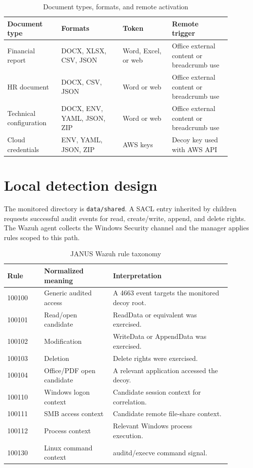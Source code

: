 \begin{table}[H]
\centering
\caption{Document types, formats, and remote activation}
\label{tab:format-policy}
\small
\begin{tabular}{p{0.22\linewidth}p{0.25\linewidth}p{0.20\linewidth}p{0.24\linewidth}}
\toprule
Document type & Formats & Token & Remote trigger \\
\midrule
Financial report & DOCX, XLSX, CSV, JSON & Word, Excel, or web & Office external content or breadcrumb use \\
HR document & DOCX, CSV, JSON & Word or web & Office external content or breadcrumb use \\
Technical configuration & DOCX, ENV, YAML, JSON, ZIP & Word or web & Office external content or breadcrumb use \\
Cloud credentials & ENV, YAML, JSON, ZIP & AWS keys & Decoy key used with AWS API \\
\bottomrule
\end{tabular}
\end{table}

\section{Local detection design}

The monitored directory is \texttt{data/shared}. A SACL entry inherited by
children requests successful audit events for read, create/write, append, and
delete rights. The Wazuh agent collects the Windows Security channel and the
manager applies rules scoped to this path.

\begin{table}[H]
\centering
\caption{JANUS Wazuh rule taxonomy}
\label{tab:wazuh-rules}
\small
\begin{tabular}{p{0.15\linewidth}p{0.28\linewidth}p{0.48\linewidth}}
\toprule
Rule & Normalized meaning & Interpretation \\
\midrule
100100 & Generic audited access & A 4663 event targets the monitored decoy root. \\
100101 & Read/open candidate & ReadData or equivalent was exercised. \\
100102 & Modification & WriteData or AppendData was exercised. \\
100103 & Deletion & Delete rights were exercised. \\
100104 & Office/PDF open candidate & A relevant application accessed the decoy. \\
100110 & Windows logon context & Candidate session context for correlation. \\
100111 & SMB access context & Candidate remote file-share context. \\
100112 & Process context & Relevant Windows process execution. \\
100130 & Linux command context & auditd/execve command signal. \\
\bottomrule
\end{tabular}
\end{table}

